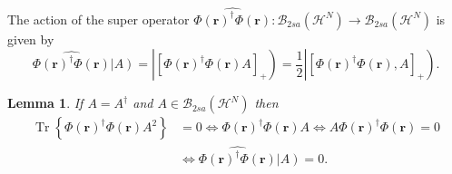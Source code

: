 \documentclass[aps,preprint]{revtex4}%
\newtheorem{lemma}[theorem]{Lemma}
\begin{document}
The action of the super operator $\widehat{\Phi\left(  \boldsymbol{r}\right)
^{\dagger}\Phi\left(  \boldsymbol{r}\right)  }:\mathcal{B}_{2sa}\left(
\mathcal{H}^{N}\right)  \rightarrow\mathcal{B}_{2sa}\left(  \mathcal{H}%
^{N}\right)  $ is given by
\begin{equation}
\widehat{\Phi\left(  \boldsymbol{r}\right)  ^{\dagger}\Phi\left(
\boldsymbol{r}\right)  }\left\vert A\right)  =\left\vert \left[  \Phi\left(
\boldsymbol{r}\right)  ^{\dagger}\Phi\left(  \boldsymbol{r}\right)  A\right]
_{+}\right)  =\frac{1}{2}\left\vert \left[  \Phi\left(  \boldsymbol{r}\right)
^{\dagger}\Phi\left(  \boldsymbol{r}\right)  ,A\right]  _{+}\right)  .
\label{supproj}%
\end{equation}


\begin{lemma}
If $A=A^{\dagger}$ and $A\in\mathcal{B}_{2sa}\left(  \mathcal{H}^{N}\right)  $
then
\begin{align}
\operatorname*{Tr}\left\{  \Phi\left(  \boldsymbol{r}\right)  ^{\dagger}%
\Phi\left(  \boldsymbol{r}\right)  A^{2}\right\}   &  =0\Leftrightarrow
\Phi\left(  \boldsymbol{r}\right)  ^{\dagger}\Phi\left(  \boldsymbol{r}%
\right)  A\Leftrightarrow A\Phi\left(  \boldsymbol{r}\right)  ^{\dagger}%
\Phi\left(  \boldsymbol{r}\right)  =0\nonumber\\
&  \Leftrightarrow\widehat{\Phi\left(  \boldsymbol{r}\right)  ^{\dagger}%
\Phi\left(  \boldsymbol{r}\right)  }\left\vert A\right)  =0.
\end{align}

\end{lemma}
\end{document}
